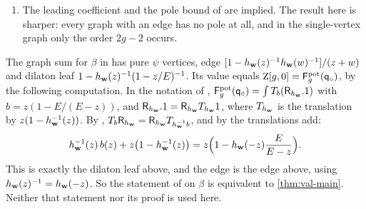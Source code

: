 \begin{rmk}
\begin{enumerate}
\item The leading coefficient and the pole bound of \cite{BS} are implied. The result here is sharper: every graph with an edge has no pole at all, and in the single-vertex graph only the order $2g-2$ occurs. 
\end{enumerate}
\end{rmk}

\begin{rmk}
\label{rmk:reg-beta}
The graph sum for $\beta$ in \cite{BS} has pure $\psi$ vertices, edge $[1-h_{\mathbf{w}}(z)^{-1}h_{\mathbf{w}}(w)^{-1}]/(z+w)$ and dilaton leaf $1-h_{\mathbf{w}}(z)^{-1}(1-z/E)^{-1}$. Its value equals $\mathrm{Z}[g,0]=\mathsf{F}^{\mathrm{pot}}_g(\mathsf{q}_{\circ})$, by the following computation. In the notation of \cite[Defs.~2.2, 2.5, 2.13]{PPZ15}, $\mathsf{F}^{\mathrm{pot}}_g(\mathsf{q}_{\circ})=\int T_{b}(\mathsf{R}_{h_{\mathbf{w}}}.1)$ with $b=z(1-E/(E-z))$, and $\mathsf{R}_{h_{\mathbf{w}}}.1=\mathsf{R}_{h_{\mathbf{w}}}T_{h_{\mathbf{w}}}1$, where $T_{h_{\mathbf{w}}}$ is the translation by $z(1-h_{\mathbf{w}}^{-1}(z))$. By \cite[Prop.~2.9]{PPZ15}, $T_b\mathsf{R}_{h_{\mathbf{w}}}=\mathsf{R}_{h_{\mathbf{w}}}T_{h_{\mathbf{w}}^{-1}b}$, and by \cite[Prop.~2.8]{PPZ15} the translations add:
\[
h_{\mathbf{w}}^{-1}(z)\,b(z)+z\big(1-h_{\mathbf{w}}^{-1}(z)\big)=z\Big(1-h_{\mathbf{w}}(-z)\frac{E}{E-z}\Big).
\]
This is exactly the dilaton leaf above, and the edge is the edge above, using $h_{\mathbf{w}}(z)^{-1}=h_{\mathbf{w}}(-z)$. So the statement of \cite{BS} on $\beta$ is equivalent to \cref{thm:val-main}. Neither that statement nor its proof is used here. 
\end{rmk}

